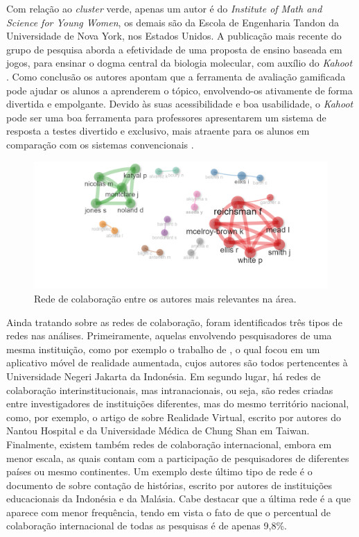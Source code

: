\documentclass[portuguese]{textolivre}
\begin{document}
Com relação ao \textit{cluster} verde, apenas um autor é do \textit{Institute of Math and Science for Young Women}, os demais são da Escola de Engenharia Tandon da Universidade de Nova York, nos Estados Unidos. A publicação mais recente do grupo de pesquisa aborda a efetividade de uma proposta de ensino baseada em jogos, para ensinar o dogma central da biologia molecular, com auxílio do \textit{Kahoot} \cite{jones_kahoot!_2019}. Como conclusão os autores apontam que a ferramenta de avaliação gamificada pode ajudar os alunos a aprenderem o tópico, envolvendo-os ativamente de forma divertida e empolgante. Devido às suas acessibilidade e boa usabilidade, o \textit{Kahoot} pode ser uma boa ferramenta para professores apresentarem um sistema de resposta a testes divertido e exclusivo, mais atraente para os alunos em comparação com os sistemas convencionais \cite{licorish_students_2018}.

\begin{figure}[h!]
    \centering
    \includegraphics[width=0.8\linewidth]{Fig5.png}
    \caption{Rede de colaboração entre os autores mais relevantes na área.}
    \label{fig5}
\end{figure}


Ainda tratando sobre as redes de colaboração, foram identificados três tipos de redes nas análises. Primeiramente, aquelas envolvendo pesquisadores de uma mesma instituição, como por exemplo o trabalho de \textcite{nurhayati_application_2022}, o qual focou em um aplicativo móvel de realidade aumentada, cujos autores são todos pertencentes à Universidade Negeri Jakarta da Indonésia. Em segundo lugar, há redes de colaboração interinstitucionais, mas intranacionais, ou seja, são redes criadas entre investigadores de instituições diferentes, mas do mesmo território nacional, como, por exemplo, o artigo de \textcite{chuang_using_2023} sobre Realidade Virtual, escrito por autores do Nantou Hospital e da Universidade Médica de Chung Shan em Taiwan. Finalmente, existem também redes de colaboração internacional, embora em menor escala, as quais contam com a participação de pesquisadores de diferentes países ou mesmo continentes. Um exemplo deste último tipo de rede é o documento de \textcite{dewi_development_2018} sobre contação de histórias, escrito por autores de instituições educacionais da Indonésia e da Malásia. Cabe destacar que a última rede é a que aparece com menor frequência, tendo em vista o fato de que o percentual de colaboração internacional de todas as pesquisas é de apenas 9,8\%.
\end{document}
